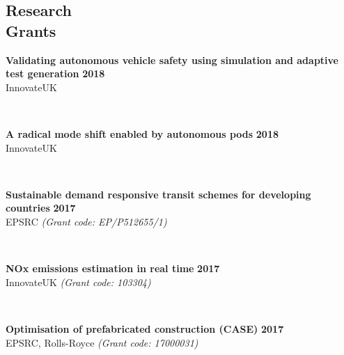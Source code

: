 \documentclass[margin]{res}
\newcommand\tab[1][1cm]{\hspace*{#1}}
\begin{document}
\begin{resume}
\vspace{-0.20in}
\section{\sc Research\\ Grants}
	\vspace{0.03in}
	\begin{minipage}{\textwidth}
	{\bf Validating autonomous vehicle safety using simulation and adaptive test generation} \hfill {\bf 2018} \\
	\tab[0.2in] 
	\quad InnovateUK
	\end{minipage}
	\\
	\vspace{0.03in}
	\begin{minipage}{\textwidth}
	{\bf A radical mode shift enabled by autonomous pods} \hfill {\bf 2018} \\
	\tab[0.2in] 
	\quad InnovateUK
	\end{minipage}
	\\
	\vspace{0.03in}
	\begin{minipage}{\textwidth}
	{\bf Sustainable demand responsive transit schemes for developing countries} \hfill {\bf 2017} \\
	\tab[0.2in] 
	\quad EPSRC
	\textit{(Grant code: EP/P512655/1)}
	\end{minipage}
	\\
	\vspace{0.03in}
	\begin{minipage}{\textwidth}
	{\bf NOx emissions estimation in real time} \hfill {\bf 2017} \\
	\tab[0.2in] 
	\quad InnovateUK
	\textit{(Grant code: 103304)}
	\end{minipage}
	\\
	\vspace{0.03in}
	\begin{minipage}{\textwidth}
	{\bf Optimisation of prefabricated construction (CASE)} \hfill {\bf 2017} \\
	\tab[0.2in] 
	\quad EPSRC, Rolls-Royce
	\textit{(Grant code: 17000031)}
	\end{minipage}
	\\
	\vspace{0.03in}
	\begin{minipage}{\textwidth}

\end{minipage}
\end{resume}
\end{document}
